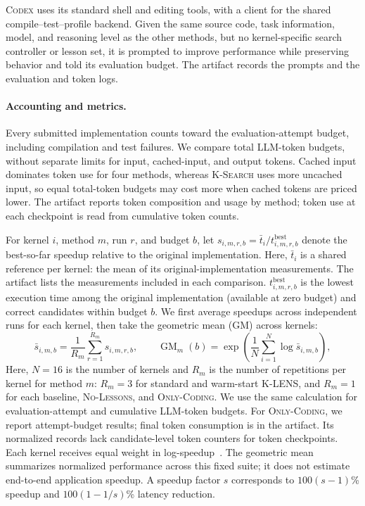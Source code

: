 \documentclass[acmsmall,screen,review,anonymous,nonacm]{acmart}
\newcommand{\klens}{\textsc{K-LENS}\xspace}
\newcommand{\ksearch}{\textsc{K-Search}\xspace}
\newcommand{\standardcodex}{\textsc{Codex}\xspace}
\newcommand{\nolessons}{\textsc{No-Lessons}\xspace}
\newcommand{\onlycodinglessons}{\textsc{Only-Coding}\xspace}
\begin{document}
\standardcodex uses its standard shell and editing tools, with a client
for the shared compile--test--profile backend. Given the same source code, task information,
model, and reasoning level as the other methods, but no kernel-specific search
controller or lesson set, it is prompted to improve performance while preserving
behavior and told its evaluation budget. The artifact records the prompts and the
evaluation and token logs.


\vspace{-3pt}
\paragraph*{Accounting and metrics.}
Every submitted implementation counts toward the evaluation-attempt budget,
including compilation and test failures.
We compare total LLM-token budgets, without separate limits
for input, cached-input, and output tokens.
Cached input dominates token use for four methods, whereas \ksearch uses more
uncached input, so equal total-token budgets may cost more when cached tokens are priced lower.
The artifact reports token composition and usage by method; token use at each
checkpoint is read from cumulative token counts.

For kernel $i$, method $m$, run $r$, and budget $b$, let
$s_{i,m,r,b}=\bar t_i/t^{\mathrm{best}}_{i,m,r,b}$ denote the
best-so-far speedup relative to the original implementation.
Here, $\bar t_i$ is a shared reference per kernel: the mean of its original-implementation
measurements. The artifact lists the measurements included in each comparison.
$t^{\mathrm{best}}_{i,m,r,b}$ is the lowest execution time among the original implementation
(available at zero budget) and correct candidates within budget $b$.
We first average speedups across independent runs for each kernel,
then take the geometric mean (GM) across kernels:
\begin{equation}
 \bar s_{i,m,b}=\frac{1}{R_m}\sum_{r=1}^{R_m}s_{i,m,r,b},\qquad
 \operatorname{GM}_m(b)=\exp\!\left(\frac{1}{N}\sum_{i=1}^{N}\log\bar s_{i,m,b}\right),
 \label{eq:aggregates}
\end{equation}
Here, $N=16$ is the number of kernels and $R_m$ is the number of repetitions per kernel for method $m$:
$R_m=3$ for standard and warm-start \klens, and $R_m=1$ for each baseline,
\nolessons, and \onlycodinglessons.
We use the same calculation for evaluation-attempt and cumulative LLM-token budgets.
For \onlycodinglessons, we report attempt-budget results; final token consumption is in the artifact.
Its normalized records lack candidate-level token counters for token checkpoints.
Each kernel receives equal weight in log-speedup~\citep{Fleming1986HowNot,Ran2025KernelBand}.
The geometric mean summarizes normalized performance across this fixed suite;
it does not estimate end-to-end application speedup.
A speedup factor $s$ corresponds to
$100(s-1)$\% speedup and $100(1-1/s)$\% latency reduction.
\end{document}
